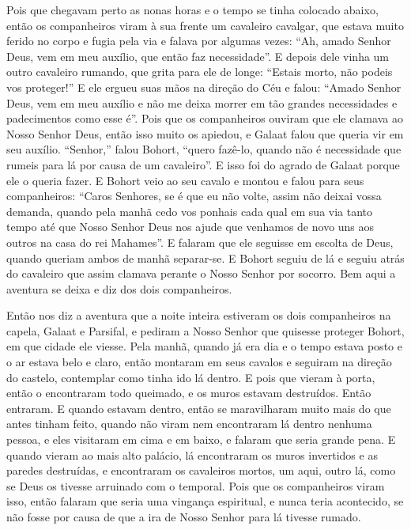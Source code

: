 Pois que chegavam perto as nonas horas e o tempo se tinha colocado abaixo, então
os companheiros viram à sua frente um cavaleiro cavalgar, que estava muito
ferido no corpo e fugia pela via e falava por algumas vezes: “Ah, amado Senhor
Deus, vem em meu auxílio, que então faz necessidade”. E depois dele vinha um
outro cavaleiro rumando, que grita para ele de longe: “Estais morto, não podeis
vos proteger!” E ele ergueu suas mãos na direção do Céu e falou: “Amado Senhor
Deus, vem em meu auxílio e não me deixa morrer em tão grandes necessidades e
padecimentos como esse é”. Pois que os companheiros ouviram que ele clamava ao
Nosso Senhor Deus, então isso muito os apiedou, e Galaat falou que queria vir
em seu auxílio. “Senhor,” falou Bohort, “quero fazê-lo, quando não é
necessidade que rumeis para lá por causa de um cavaleiro”. E isso foi do agrado
de Galaat porque ele o queria fazer. E Bohort veio ao seu cavalo e montou e
falou para seus companheiros: “Caros Senhores, se é que eu não volte, assim não
deixai vossa demanda, quando pela manhã cedo vos ponhais cada qual em sua via
tanto tempo até que Nosso Senhor Deus nos ajude que venhamos de novo uns aos
outros na casa do rei Mahames”. E falaram que ele seguisse em escolta de Deus,
quando queriam ambos de manhã separar-se. E Bohort seguiu de lá e seguiu atrás
do cavaleiro que assim clamava perante o Nosso Senhor por socorro. Bem aqui a
aventura se deixa e diz dos dois companheiros.

Então nos diz a aventura que a noite inteira estiveram os dois companheiros na
capela, Galaat e Parsifal, e pediram a Nosso Senhor que quisesse proteger
Bohort, em que cidade ele viesse. Pela manhã, quando já era dia e o
tempo estava posto e o ar estava belo e claro, então montaram em seus cavalos e
seguiram na direção do castelo, contemplar como tinha ido lá dentro. E pois que
vieram à porta, então o encontraram todo queimado, e os muros estavam
destruídos. Então entraram. E quando estavam dentro, então se maravilharam
muito mais do que antes tinham feito, quando não viram nem encontraram lá
dentro nenhuma pessoa, e eles visitaram em cima e em baixo, e falaram que seria
grande pena. E quando vieram ao mais alto palácio, lá encontraram os muros
invertidos e as paredes destruídas, e encontraram os cavaleiros mortos, um
aqui, outro lá, como se Deus os tivesse arruinado com o temporal. Pois que os
companheiros viram isso, então falaram que seria uma vingança espiritual, e
nunca teria acontecido, se não fosse por causa de que a ira de Nosso Senhor
para lá tivesse rumado.

